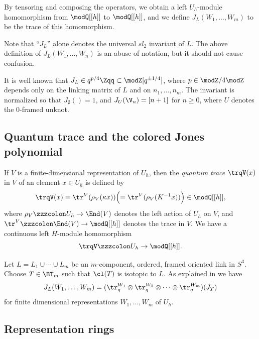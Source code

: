 \documentclass{amsart}
\numberwithin{equation}{section}
\numberwithin{figure}{section}
\theoremstyle{plain}
\theoremstyle{definition}
\theoremstyle{remark}
\begin{document}
By tensoring and composing the operators, we obtain a left
$U_h$-module homomorphism from $\modQ [[h]]$ to $\modQ [[h]]$, and we define
$J_L(W_1,\ldots,W_m)$ to be the trace of this homomorphism.

Note that ``$J_L$'' alone denotes the universal $sl_2$ invariant of
$L$.  The above definition of $J_L(W_1,\ldots,W_n)$ is an abuse of
notation, but it should not cause confusion.

It is well known that $J_L\in q^{p/4}\Zqq\subset \modZ [q^{\pm 1/4}]$, where
$p\in \modZ /4\modZ $ depends only on the linking matrix of $L$ and on
$n_1,\ldots,n_m$.  The invariant is normalized so that
$J_{\emptyset}()=1$, and $J_U(\V_n)=[n+1]$ for $n\ge 0$, where $U$
denotes the $0$-framed unknot.

\subsection{Quantum trace and the colored Jones polynomial}
\label{sec:quantum-trace}

If $V$ is a finite-dimensional representation of $U_h$, then the
{\em quantum trace} $\trqV(x)$ in $V$ of an element $x\in U_h$ is
defined by
\begin{equation*}
  \trqV(x) = \tr^V(\rho _V(\kappa x)) \Bigl(= \tr^V(\rho _V(K^{-1}x))\Bigr)\in \modQ [[h]],
\end{equation*}
where $\rho _V\zzzcolon U_h\rightarrow \End(V)$ denotes the left action of $U_h$ on $V$,
and $\tr^V\zzzcolon \End(V)\rightarrow \modQ [[h]]$ denotes the trace in $V$.  We have a
continuous left $H$-module homomorphism
\begin{equation*}
  \trqV\zzzcolon U_h\rightarrow \modQ [[h]].
\end{equation*}

Let $L=L_1\cup \cdots\cup L_m$ be an $m$-component, ordered, framed oriented
link in $S^3$.  Choose $T\in \BT_m$ such that $\cl(T)$ is isotopic to
$L$.  As explained in \cite[Section 1.2]{H:universal} we have
\begin{equation}
  \label{e1}
  J_L(W_1,\ldots,W_m)
  =(\tr_q^{W_1}\otimes \tr_q^{W_2}\otimes \cdots\otimes \tr_q^{W_m})(J_T)
\end{equation}
for finite dimensional representations $W_1,\ldots,W_m$ of $U_h$.

\subsection{Representation rings}
\label{sec:representation-ring-}
\end{document}
